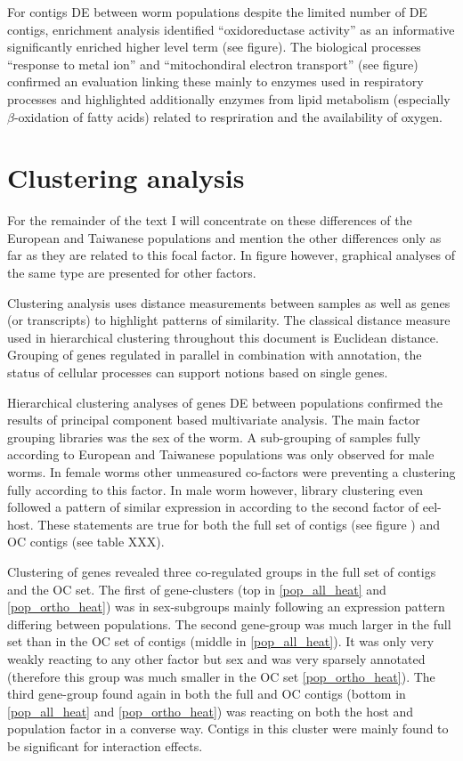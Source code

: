 \documentclass[10pt]{article}
\begin{document}
For contigs DE between worm populations despite the limited number of
DE contigs, enrichment analysis identified ``oxidoreductase activity''
as an informative significantly enriched higher level term (see
figure). The biological processes ``response to metal ion'' and
``mitochondiral electron transport'' (see figure) confirmed an
evaluation linking these mainly to enzymes used in respiratory
processes and highlighted additionally enzymes from lipid metabolism
(especially $\beta$-oxidation of fatty acids) related to respriration
and the availability of oxygen.

\section{Clustering analysis}

For the remainder of the text I will concentrate on these differences
of the European and Taiwanese populations and mention the other
differences only as far as they are related to this focal factor. In
figure however, graphical analyses of the same type are presented for
other factors.

Clustering analysis uses distance measurements between samples as well
as genes (or transcripts) to highlight patterns of similarity. The
classical distance measure used in hierarchical clustering throughout
this document is Euclidean distance. Grouping of genes regulated in
parallel in combination with annotation, the status of cellular
processes can support notions based on single genes.

Hierarchical clustering analyses of genes DE between populations
confirmed the results of principal component based multivariate
analysis. The main factor grouping libraries was the sex of the
worm. A sub-grouping of samples fully according to European and
Taiwanese populations was only observed for male worms. In female
worms other unmeasured co-factors were preventing a clustering fully
according to this factor. In male worm however, library clustering
even followed a pattern of similar expression in according to the
second factor of eel-host. These statements are true for both the full
set of contigs (see figure ) and OC contigs (see table XXX).

Clustering of genes revealed three co-regulated groups in the full set
of contigs and the OC set. The first of gene-clusters (top in
\ref{pop_all_heat} and \ref{pop_ortho_heat}) was in sex-subgroups
mainly following an expression pattern differing between
populations. The second gene-group was much larger in the full set
than in the OC set of contigs (middle in \ref{pop_all_heat}). It was
only very weakly reacting to any other factor but sex and was very
sparsely annotated (therefore this group was much smaller in the OC
set \ref{pop_ortho_heat}). The third gene-group found again in both
the full and OC contigs (bottom in \ref{pop_all_heat} and
\ref{pop_ortho_heat}) was reacting on both the host and population
factor in a converse way. Contigs in this cluster were mainly found to
be significant for interaction effects.
\end{document}
